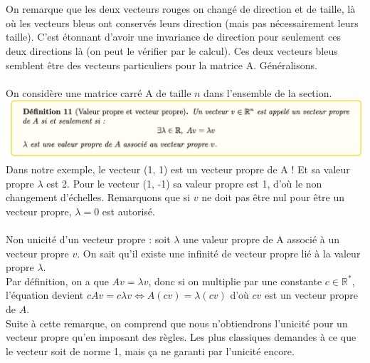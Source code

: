                     \\
                    \\
                    On remarque que les deux vecteurs rouges on changé de direction et de taille, là où les vecteurs bleus ont conservés leurs direction (mais pas nécessairement leurs taille). C’est étonnant d’avoir une invariance de direction pour seulement ces deux directions là (on peut le vérifier par le calcul). Ces deux vecteurs bleus semblent être des vecteurs particuliers pour la matrice A. Généralisons.
                    \\
                    \\
                    On considère une matrice carré A de taille $n$ dans l’ensemble de la section.
                    \\
                    \includegraphics[width=\linewidth]{./img/reduction_dim/pca/def_val_prp}
                    \\
                    Dans notre exemple, le vecteur (1, 1) est un vecteur propre de A ! Et sa valeur propre $\lambda$ est 2. Pour le vecteur (1, -1) sa valeur propre est 1, d’où le non changement d’échelles. Remarquons que si $v$ ne doit pas être nul pour être un vecteur propre, $\lambda = 0$ est autorisé.
                    \\
                    \\
                    Non unicité d’un vecteur propre : soit $\lambda$ une valeur propre de A associé à un vecteur propre $v$. On sait qu’il existe une infinité de vecteur propre lié à la valeur propre $\lambda$.
                    \\
                    Par définition, on a que $Av = \lambda v$, donc si on multiplie par une constante $c \in \mathbb{R}^*$, l’équation devient $cAv = c \lambda v \iff A(cv) = \lambda (cv)$ d’où $cv$ est un vecteur propre de $A$.
                    \\
                    Suite à cette remarque, on comprend que nous n’obtiendrons l’unicité pour un vecteur propre qu’en imposant des règles. Les plus classiques demandes à ce que le vecteur soit de norme 1, mais ça ne garanti par l’unicité encore.
                    \\
                    \\
